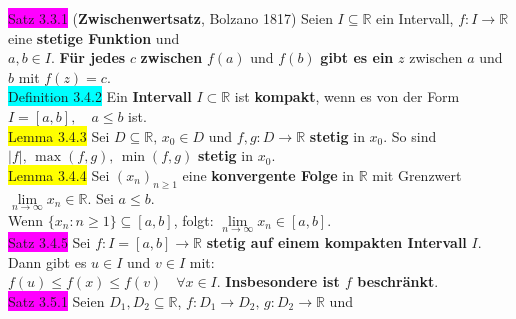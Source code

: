 \documentclass[10pt]{article}
\begin{document}
\colorbox{magenta}{Satz 3.3.1} (\textbf{Zwischenwertsatz}, Bolzano 1817) Seien 
                \textcolor{NavyBlue}{$I\subseteq\mathbb{R}$} ein Intervall, 
                \textcolor{NavyBlue}{$f:I\longrightarrow\mathbb{R}$} 
                eine \textbf{stetige Funktion} und \\
        \indent \textcolor{NavyBlue}{$a,b\in I$}. 
                \textbf{Für jedes} \textcolor{NavyBlue}{$c$} \textbf{zwischen} 
                \textcolor{NavyBlue}{$f(a)$} und \textcolor{NavyBlue}{$f(b)$} 
                \textbf{gibt es ein} \textcolor{NavyBlue}{$z$} 
                zwischen \textcolor{NavyBlue}{$a$} und \textcolor{NavyBlue}{$b$} mit 
                \textcolor{NavyBlue}{$f(z)=c$}.\\
\colorbox{cyan}{Definition 3.4.2} Ein \textbf{Intervall} $I\subset\mathbb{R}$ ist 
                \textbf{kompakt}, wenn es 
                von der Form \textcolor{NavyBlue}{$I=[a,b],\quad a\leqslant b$} ist.\\
\colorbox{yellow}{Lemma 3.4.3} Sei \textcolor{NavyBlue}{$D\subseteq\mathbb{R},\,x_0\in D$} und 
                \textcolor{NavyBlue}{$f,g:D\longrightarrow\mathbb{R}$} 
                \textbf{stetig} in \textcolor{NavyBlue}{$x_0$}. So sind 
                \textcolor{NavyBlue}{
                $|f|,\,\max(f,g),\,\min(f,g)$} \textbf{stetig} in \textcolor{NavyBlue}{$x_0$}.\\
\colorbox{yellow}{Lemma 3.4.4} Sei \textcolor{NavyBlue}{$(x_n)_{n\geqslant1}$}
                eine \textbf{konvergente Folge} in 
                $\mathbb{R}$ mit Grenzwert 
                \textcolor{NavyBlue}{$\lim\limits_{n\to\infty}x_n\in\mathbb{R}$}. 
                Sei \textcolor{NavyBlue}{$a\leqslant b$}. \\
        \indent Wenn \textcolor{NavyBlue}{$\{x_n:n\geqslant1\}\subseteq[a,b]$}, folgt: 
                \textcolor{NavyBlue}{$\lim\limits_{n\to\infty}x_n\in[a,b]$}. \\
\colorbox{magenta}{Satz 3.4.5} Sei \textcolor{NavyBlue}{$f:I=[a,b]\longrightarrow\mathbb{R}$}
                \textbf{stetig auf einem kompakten Intervall} \textcolor{NavyBlue}{$I$}. 
                Dann gibt es \textcolor{NavyBlue}{$u\in I$} und 
                \textcolor{NavyBlue}{$v\in I$} mit: \\
        \indent \textcolor{NavyBlue}{$f(u)\leqslant f(x)\leqslant f(v)\quad\forall x\in I$}. 
                \textbf{Insbesondere ist \textcolor{NavyBlue}{$f$} beschränkt}.\\
\colorbox{magenta}{Satz 3.5.1} Seien \textcolor{NavyBlue}{$D_1,D_2\subseteq\mathbb{R}$, 
                $f:D_1\longrightarrow D_2,\,g:D_2\longrightarrow\mathbb{R}$} und 
\end{document}

